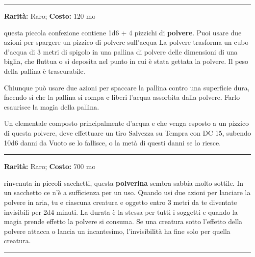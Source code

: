 \begin{multicols}{2}
\smallskip\noindent\rule{\linewidth}{2pt}  \hypertarget{Polveredell'Aridità}{}\medskip{}\noindent\label{Polveredell'Aridità}

\textbf{Rarità:} Raro; \textbf{Costo:} 120 mo

questa piccola confezione contiene 1d6 + 4 pizzichi di \textbf{polvere}. Puoi usare due azioni per spargere un pizzico di polvere sull'acqua La polvere trasforma un cubo d'acqua di 3 metri di spigolo in una pallina di polvere delle dimensioni di una biglia, che fluttua o si deposita nel punto in cui è stata gettata la polvere. Il peso della pallina è trascurabile.

Chiunque può usare due azioni per spaccare la pallina contro una superficie dura, facendo sì che la pallina si rompa e liberi l'acqua assorbita dalla polvere. Farlo esaurisce la magia della pallina.

Un elementale composto principalmente d'acqua e che venga esposto a un pizzico di questa polvere, deve effettuare un tiro Salvezza su Tempra con DC 15, subendo 10d6 danni da Vuoto se lo fallisce, o la metà di questi danni se lo riesce.

\smallskip\noindent\rule{\linewidth}{2pt}  \hypertarget{PolveredellaSparizione}{}\medskip{}\noindent\label{PolveredellaSparizione}

\textbf{Rarità:} Raro; \textbf{Costo:} 700 mo

rinvenuta in piccoli sacchetti, questa \textbf{polverina} sembra sabbia molto sottile. In un sacchetto ce n'è a sufficienza per un uso. Quando usi due azioni per lanciare la polvere in aria, tu e ciascuna creatura e oggetto entro 3 metri da te diventate invisibili per 2d4 minuti. La durata è la stessa per tutti i soggetti e quando la magia prende effetto la polvere si consuma. Se una creatura sotto l'effetto della polvere attacca o lancia un incantesimo, l'invisibilità ha fine solo per quella creatura.

\smallskip\noindent\rule{\linewidth}{2pt}  \hypertarget{PolveredelloStarnutoedelSoffocamento}{}\medskip{}\noindent\label{PolveredelloStarnutoedelSoffocamento}


\end{multicols}
